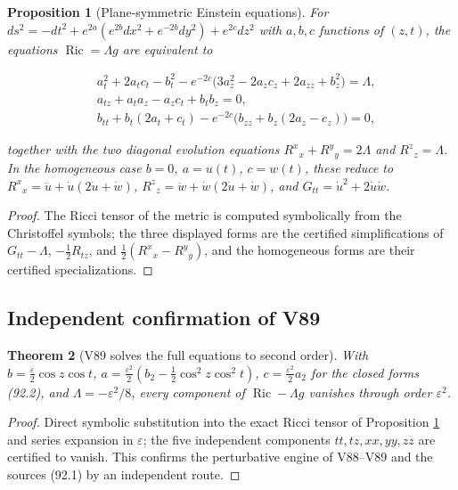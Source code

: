 \documentclass[11pt]{article}
\newtheorem{theorem}{Theorem}[section]
\newtheorem{proposition}[theorem]{Proposition}
\theoremstyle{remark}
\begin{document}
\begin{proposition}[Plane-symmetric Einstein equations]
\label{prop:v19v91-system}
For \(ds^2=-dt^2+e^{2a}(e^{2b}dx^2+e^{-2b}dy^2)+e^{2c}dz^2\) with
\(a,b,c\) functions of \((z,t)\), the equations
\(\operatorname{Ric}=\Lambda g\) are equivalent to

\[
\begin{aligned}
 &a_t^2+2a_tc_t-b_t^2-e^{-2c}\bigl(3a_z^2-2a_zc_z+2a_{zz}+b_z^2\bigr)=\Lambda,\\
 &a_{tz}+a_ta_z-a_zc_t+b_tb_z=0,\\
 &b_{tt}+b_t(2a_t+c_t)-e^{-2c}\bigl(b_{zz}+b_z(2a_z-c_z)\bigr)=0,
\end{aligned}                                                          \tag{94.1}
\]

together with the two diagonal evolution equations
\(R^x{}_x+R^y{}_y=2\Lambda\) and \(R^z{}_z=\Lambda\).  In the
homogeneous case \(b=0\), \(a=u(t)\), \(c=w(t)\), these reduce to
\(R^x{}_x=\ddot u+\dot u(2\dot u+\dot w)\),
\(R^z{}_z=\ddot w+\dot w(2\dot u+\dot w)\), and
\(G_{tt}=\dot u^2+2\dot u\dot w\).
\end{proposition}

\begin{proof}
The Ricci tensor of the metric is computed symbolically from the
Christoffel symbols; the three displayed forms are the certified
simplifications of \(G_{tt}-\Lambda\), \(-\tfrac12R_{tz}\), and
\(\tfrac12(R^x{}_x-R^y{}_y)\), and the homogeneous forms are their
certified specializations.
\end{proof}

\subsection{Independent confirmation of V89}

\begin{theorem}[V89 solves the full equations to second order]
\label{thm:v19v91-confirm}
With \(b=\tfrac\varepsilon2\cos z\cos t\),
\(a=\tfrac{\varepsilon^2}2(b_2-\tfrac12\cos^2z\cos^2t)\),
\(c=\tfrac{\varepsilon^2}2a_2\) for the closed forms (92.2), and
\(\Lambda=-\varepsilon^2/8\), every component of
\(\operatorname{Ric}-\Lambda g\) vanishes through order
\(\varepsilon^2\).
\end{theorem}

\begin{proof}
Direct symbolic substitution into the exact Ricci tensor of
Proposition \ref{prop:v19v91-system} and series expansion in
\(\varepsilon\); the five independent components \(tt,tz,xx,yy,zz\)
are certified to vanish.  This confirms the perturbative engine of
V88--V89 and the sources (92.1) by an independent route.
\end{proof}
\end{document}
